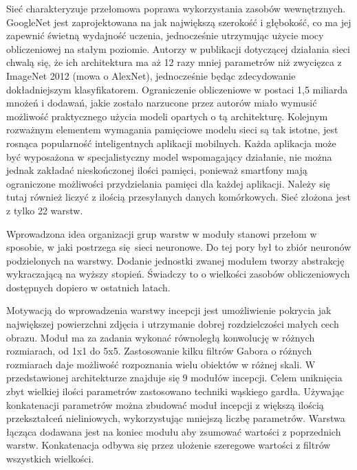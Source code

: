 \documentclass[12pt,a4paper,twoside,titlepage,openright]{book}
\begin{document}
\begin{itemize}
Sieć charakteryzuje przełomowa poprawa wykorzystania zasobów wewnętrznych. GoogleNet jest zaprojektowana na jak największą szerokość i głębokość, co ma jej zapewnić świetną wydajność uczenia, jednocześnie utrzymując użycie mocy obliczeniowej na stałym poziomie. Autorzy w publikacji dotyczącej działania sieci chwalą się, że ich architektura ma aż 12 razy mniej parametrów niż zwycięzca z ImageNet 2012 (mowa o AlexNet), jednocześnie będąc zdecydowanie dokładniejszym klasyfikatorem. Ograniczenie obliczeniowe w postaci 1,5 miliarda mnożeń i dodawań, jakie zostało narzucone przez autorów miało wymusić możliwość praktycznego użycia modeli opartych o tą architekturę. Kolejnym rozważnym elementem wymagania pamięciowe modelu sieci są tak istotne, jest rosnąca popularność inteligentnych aplikacji mobilnych. Każda aplikacja może być wyposażona w specjalistyczny model wspomagający działanie, nie można jednak zakładać nieskończonej ilości pamięci, ponieważ smartfony mają ograniczone możliwości przydzielania pamięci dla każdej aplikacji. Należy się tutaj również liczyć z ilością przesyłanych danych komórkowych. Sieć złożona jest z tylko 22 warstw.

Wprowadzona idea organizacji grup warstw w moduły stanowi przełom w sposobie, w jaki postrzega się sieci neuronowe. Do tej pory był to zbiór neuronów podzielonych na warstwy. Dodanie jednostki zwanej modułem tworzy abstrakcję wykraczającą na wyższy stopień. Świadczy to o wielkości zasobów obliczeniowych dostępnych dopiero w ostatnich latach. \cite{DBLP:journals/corr/SzegedyLJSRAEVR14}

Motywacją do wprowadzenia warstwy incepcji jest umożliwienie pokrycia jak największej powierzchni zdjęcia i utrzymanie dobrej rozdzielczości małych cech obrazu. Moduł ma za zadania wykonać równoległą konwolucję w różnych rozmiarach, od 1x1 do 5x5. Zastosowanie kilku filtrów Gabora o różnych rozmiarach daje możliwość rozpoznania wielu obiektów w różnej skali. W przedstawionej architekturze znajduje się 9 modułów incepcji. Celem uniknięcia zbyt wielkiej ilości parametrów zastosowano techniki wąskiego gardła. Używając konkatenacji parametrów można zbudować moduł incepcji z większą ilością przekształceń nieliniowych, wykorzystując mniejszą liczbę parametrów. Warstwa łącząca dodawana jest na koniec modułu aby zsumować wartości z poprzednich warstw. Konkatenacja odbywa się przez ułożenie szeregowe wartości z filtrów wszystkich wielkości.


\end{itemize}
\end{document}
